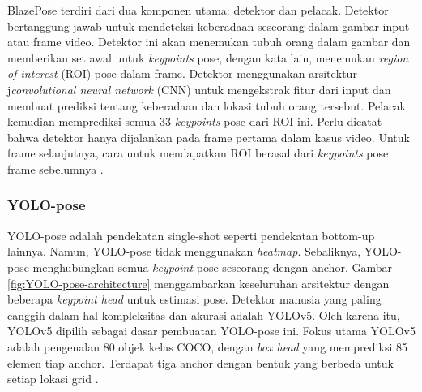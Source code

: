 BlazePose terdiri dari dua komponen utama: detektor dan pelacak. Detektor bertanggung jawab untuk mendeteksi keberadaan seseorang dalam gambar input atau frame video. Detektor ini akan menemukan tubuh orang dalam gambar dan memberikan set awal untuk \emph{keypoints} pose, dengan kata lain, menemukan \emph{region of interest} (ROI) pose dalam frame.
Detektor menggunakan arsitektur j\emph{convolutional neural network} (CNN) untuk mengekstrak fitur dari input dan membuat prediksi tentang keberadaan dan lokasi tubuh orang tersebut. Pelacak kemudian memprediksi semua 33 \emph{keypoints} pose dari ROI ini. Perlu dicatat bahwa detektor hanya dijalankan pada frame pertama dalam kasus video. Untuk frame selanjutnya, cara untuk mendapatkan ROI berasal dari \emph{keypoints} pose frame sebelumnya \parencite{url:BlazePose}.

\subsubsection{YOLO-pose}
\label{subsubsec:yolopose}

YOLO-pose adalah pendekatan single-shot seperti pendekatan bottom-up lainnya. Namun, YOLO-pose tidak menggunakan \emph{heatmap}. Sebaliknya, YOLO-pose menghubungkan semua \emph{keypoint} pose seseorang dengan anchor. Gambar \ref{fig:YOLO-pose-architecture} menggambarkan keseluruhan arsitektur  
dengan beberapa \emph{keypoint head} untuk estimasi pose. Detektor manusia yang paling canggih dalam hal kompleksitas dan akurasi adalah YOLOv5. Oleh karena itu, YOLOv5 dipilih sebagai dasar pembuatan YOLO-pose ini.
Fokus utama YOLOv5 adalah pengenalan 80 objek kelas COCO, dengan \emph{box head} yang memprediksi 85 elemen tiap anchor. Terdapat tiga anchor dengan bentuk yang berbeda untuk setiap lokasi grid \parencite{maji2022yolopose}.

